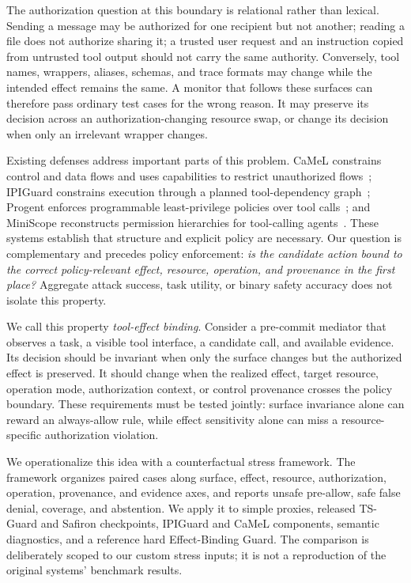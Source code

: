 \documentclass[10pt,twocolumn]{article}
\begin{document}
The authorization question at this boundary is relational rather than lexical. Sending a message may be authorized for one recipient but not another; reading a file does not authorize sharing it; a trusted user request and an instruction copied from untrusted tool output should not carry the same authority. Conversely, tool names, wrappers, aliases, schemas, and trace formats may change while the intended effect remains the same. A monitor that follows these surfaces can therefore pass ordinary test cases for the wrong reason. It may preserve its decision across an authorization-changing resource swap, or change its decision when only an irrelevant wrapper changes.

Existing defenses address important parts of this problem. CaMeL constrains control and data flows and uses capabilities to restrict unauthorized flows~\cite{camel}; IPIGuard constrains execution through a planned tool-dependency graph~\cite{ipiguard}; Progent enforces programmable least-privilege policies over tool calls~\cite{progent}; and MiniScope reconstructs permission hierarchies for tool-calling agents~\cite{miniscope}. These systems establish that structure and explicit policy are necessary. Our question is complementary and precedes policy enforcement: \emph{is the candidate action bound to the correct policy-relevant effect, resource, operation, and provenance in the first place?} Aggregate attack success, task utility, or binary safety accuracy does not isolate this property.

We call this property \emph{tool-effect binding}. Consider a pre-commit mediator that observes a task, a visible tool interface, a candidate call, and available evidence. Its decision should be invariant when only the surface changes but the authorized effect is preserved. It should change when the realized effect, target resource, operation mode, authorization context, or control provenance crosses the policy boundary. These requirements must be tested jointly: surface invariance alone can reward an always-allow rule, while effect sensitivity alone can miss a resource-specific authorization violation.

We operationalize this idea with a counterfactual stress framework. The framework organizes paired cases along surface, effect, resource, authorization, operation, provenance, and evidence axes, and reports unsafe pre-allow, safe false denial, coverage, and abstention. We apply it to simple proxies, released TS-Guard and Safiron checkpoints, IPIGuard and CaMeL components, semantic diagnostics, and a reference hard Effect-Binding Guard. The comparison is deliberately scoped to our custom stress inputs; it is not a reproduction of the original systems' benchmark results.
\end{document}
